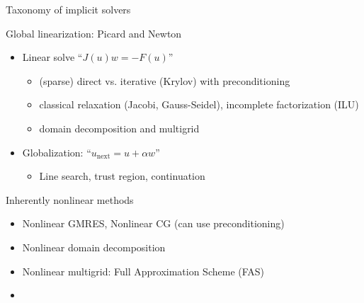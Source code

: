 \documentclass{beamer}
\begin{document}
\begin{frame}{Taxonomy of implicit solvers}
  \begin{block}{Global linearization: Picard and Newton}
    \begin{itemize}
    \item Linear solve ``$J(u) w = -F(u)$''
      \begin{itemize}
      \item (sparse) direct vs. iterative (Krylov) with preconditioning
      \item classical relaxation (Jacobi, Gauss-Seidel), incomplete factorization (ILU)
      \item \alert<2->{domain decomposition and multigrid}
      \end{itemize}
    \item Globalization: ``$u_{\text{next}} = u + \alpha w$''
      \begin{itemize}
      \item Line search, trust region, continuation
      \end{itemize}
    \end{itemize}
  \end{block}
  \begin{block}{Inherently nonlinear methods}
    \begin{itemize}
    \item Nonlinear GMRES, Nonlinear CG (can use preconditioning)
    \item \alert<2->{Nonlinear domain decomposition}
    \item \alert<2->{Nonlinear multigrid: Full Approximation Scheme (FAS)}
    \end{itemize}
  \end{block}
  \begin{itemize}
  \item<2-> 
  \end{itemize}
\end{frame}
\end{document}
